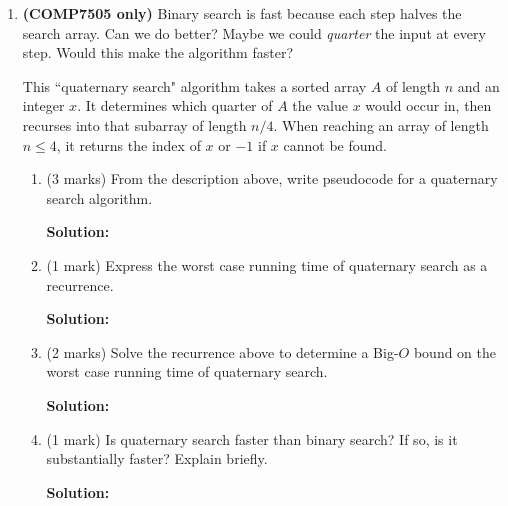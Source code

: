 \documentclass[a4,13pt]{extarticle}
\newenvironment{Solution}{\color{blue}\textbf{Solution:}}{}
\begin{document}
\begin{enumerate}
\begin{enumerate}
	      	\begin{Solution}
	      	\end{Solution}
	      	      	      	              
	      \end{enumerate}
	      	              
	      	              
	      \newpage 
	\item 
	      \textbf{(COMP7505 only)} Binary search is fast because each step halves the search array. Can we do better? 
	      Maybe we could \textit{quarter} the input at every step. Would this make the algorithm faster?
	      	      
	      This ``quaternary search" algorithm takes a sorted array $A$ of length $n$ and an integer $x$. 
	      It determines which quarter of $A$ the value $x$ would occur in, then recurses into that subarray of length $n/4$. 
	      When reaching an array of length $n\le 4$, it returns the index of $x$ or $-1$ if $x$ cannot be found.
	      	              
	      \begin{enumerate}
	      	\item (3 marks) From the description above, write pseudocode for a quaternary search algorithm.
	      	
	      	\begin{Solution}
	      	\end{Solution}
	      	
	      	\item (1 mark) Express the worst case running time of quaternary search as a recurrence.
	      	
	      	
	      	\begin{Solution}
	      	\end{Solution}
	      	
	      	
	      	\item (2 marks) Solve the recurrence above to determine a Big-$O$ bound on the worst case running time of quaternary search.
	      	
	      	\begin{Solution}
	      	\end{Solution}
	      	
	      	\item (1 mark) Is quaternary search faster than binary search? If so, is it substantially faster? Explain briefly.
	      	
	      	\begin{Solution}
	      	\end{Solution}
	      	      	      	                  

\end{enumerate}
\end{enumerate}
\end{document}
